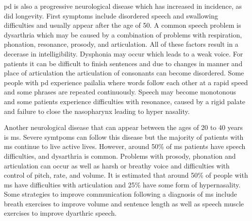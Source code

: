 \gls{pd} is also a progressive neurological disease which has increased in incidence, as did longevity. First symptoms include disordered speech and swallowing difficulties and usually appear after the age of 50. A common speech problem is \gls{dysarthria} which may be caused by a combination of problems with respiration, phonation, resonance, prosody, and articulation. All of these factors result in a decerase in intelligibility. Dysphonia may occur which leads to a weak voice. For patients it can be difficult to finish sentences and due to changes in manner and place of articulation the articulation of consonants can become disordered. Some people with \gls{pd} experience pailalia where words follow each other at a rapid speed and some phrases are repeated continuously. Speech may become monotonous and some patients experience difficulties with resonance, caused by a rigid palate and failure to close the nasopharynx leading to hyper nasality.\cite{communicationDifficulties}

Another neurological disease that can appear between the ages of 20 to 40 years is \gls{ms}. Severe symtpoms can follow this disease but the majority of patients with \gls{ms} continue to live active lives. However, around 50\% of \gls{ms} patients have speech difficulties, and \gls{dysarthria} is common. 
Problems with prosody, phonation and articulation can occur as well as harsh or breathy voice and difficulties with control of pitch, rate, and volume. It is estimated that around 50\% of people with \gls{ms} have difficulties with
articulation and 25\% have some form of hypernasality. Some strategies to improve communication following a diagnosis of \gls{ms} include breath exercises to improve volume and sentence length as well as speech muscle exercises to improve dyarthric speech. \cite{communicationDifficulties}


